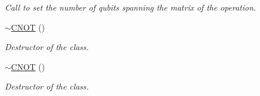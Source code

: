 \begin{DoxyCompactItemize}
\begin{DoxyCompactList}\small\item\em Call to set the number of qubits spanning the matrix of the operation. \end{DoxyCompactList}\item 
\hyperlink{class_c_n_o_t_a9074d4194dff57830d2495c245322b5b}{$\sim$\+C\+N\+OT} ()
\begin{DoxyCompactList}\small\item\em Destructor of the class. \end{DoxyCompactList}\item 
\hyperlink{class_c_n_o_t_a9074d4194dff57830d2495c245322b5b}{$\sim$\+C\+N\+OT} ()
\begin{DoxyCompactList}\small\item\em Destructor of the class. \end{DoxyCompactList}\end{DoxyCompactItemize}

